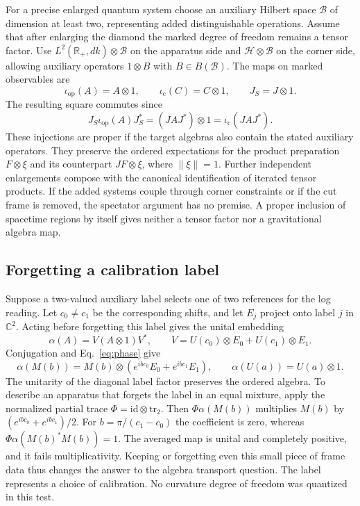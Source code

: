 \documentclass[11pt,letterpaper]{article}
\begin{document}
For a precise enlarged quantum system choose an auxiliary Hilbert space $\mathcal B$ of dimension at least two, representing added distinguishable operations. Assume that after enlarging the diamond the marked degree of freedom remains a tensor factor. Use $L^2(\mathbb R_+,dk)\otimes\mathcal B$ on the apparatus side and $\mathcal H\otimes\mathcal B$ on the corner side, allowing auxiliary operators $1\otimes B$ with $B\in B(\mathcal B)$. The maps on marked observables are
\[
 \iota_{\mathrm{op}}(A)=A\otimes 1,\qquad
 \iota_{\mathrm{c}}(C)=C\otimes 1,\qquad J_S=J\otimes1.
\]
The resulting square commutes since
\[
 J_S\iota_{\mathrm{op}}(A)J_S^*=(JAJ^*)\otimes1
                            =\iota_{\mathrm{c}}(JAJ^*) .
\]
These injections are proper if the target algebras also contain the stated auxiliary operators. They preserve the ordered expectations for the product preparation $F\otimes\xi$ and its counterpart $JF\otimes\xi$, where $\|\xi\|=1$. Further independent enlargements compose with the canonical identification of iterated tensor products. If the added systems couple through corner constraints or if the cut frame is removed, the spectator argument has no premise. A proper inclusion of spacetime regions by itself gives neither a tensor factor nor a gravitational algebra map.

\subsection{Forgetting a calibration label}

Suppose a two-valued auxiliary label selects one of two references for the log reading. Let $c_0\ne c_1$ be the corresponding shifts, and let $E_j$ project onto label $j$ in $\mathbb C^2$. Acting before forgetting this label gives the unital embedding
\[
 \alpha(A)=V(A\otimes1)V^*,\qquad
 V=U(c_0)\otimes E_0+U(c_1)\otimes E_1 .
\]
Conjugation and Eq.~\eqref{eq:phase} give
\[
 \alpha(M(b))=M(b)\otimes(e^{ibc_0}E_0+e^{ibc_1}E_1),
 \qquad \alpha(U(a))=U(a)\otimes1 .
\]
The unitarity of the diagonal label factor preserves the ordered algebra. To describe an apparatus that forgets the label in an equal mixture, apply the normalized partial trace $\Phi=\mathrm{id}\otimes\mathrm{tr}_2$. Then $\Phi\alpha(M(b))$ multiplies $M(b)$ by $(e^{ibc_0}+e^{ibc_1})/2$. For $b=\pi/(c_1-c_0)$ the coefficient is zero, whereas $\Phi\alpha(M(b)^*M(b))=1$. The averaged map is unital and completely positive, and it fails multiplicativity. Keeping or forgetting even this small piece of frame data thus changes the answer to the algebra transport question. The label represents a choice of calibration. No curvature degree of freedom was quantized in this test.
\end{document}
